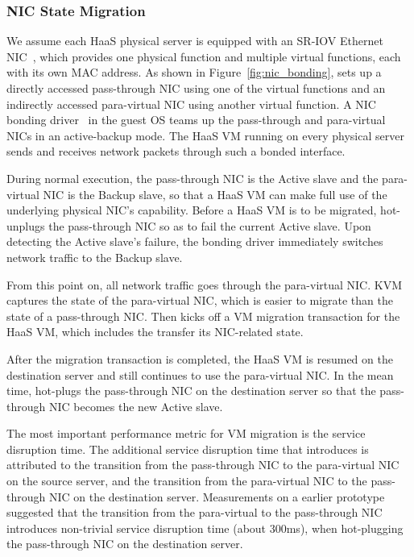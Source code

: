 \subsubsection{NIC State Migration}
\label{sec:nic_migration}

We assume each HaaS physical server is equipped with an SR-IOV Ethernet NIC~\cite{dong:2008},
which provides one physical function and multiple virtual functions, each with its own MAC address.
As shown in Figure~\ref{fig:nic_bonding},
\na sets up a directly accessed pass-through NIC using one of the virtual functions
and an indirectly accessed para-virtual NIC using another virtual function.
A NIC bonding driver~\cite{bond-dri} in the guest OS teams up the pass-through and para-virtual NICs in an active-backup mode.
The HaaS VM running on every \na physical server sends and receives network packets through such a bonded interface.

During normal execution, the pass-through NIC is the Active slave and the para-virtual NIC is the Backup slave,
so that a HaaS VM can make full use of the underlying physical NIC's capability.
Before a HaaS VM is to be migrated, \na hot-unplugs the pass-through NIC so as to fail the current Active slave.
Upon detecting the Active slave's failure, the bonding driver immediately switches network traffic to the Backup slave.

From this point on, all network traffic goes through the para-virtual NIC.
KVM captures the state of the para-virtual NIC, which is easier to migrate than the state of a pass-through NIC.
Then \na kicks off a VM migration transaction for the HaaS VM, which includes the transfer its NIC-related state.

After the migration transaction is completed, the HaaS VM is resumed on the destination server and still continues to use the para-virtual NIC.
In the mean time, \na hot-plugs the pass-through NIC on the destination  server
so that the pass-through NIC becomes the new Active slave.



The most important performance metric for VM migration is the service disruption time.
The additional service disruption time that \na introduces is attributed to the transition from
the pass-through NIC to the para-virtual NIC on the source server, and the transition from
the para-virtual NIC to the pass-through NIC on the destination server.
Measurements on a earlier \na prototype suggested that the transition from the
para-virtual to the pass-through NIC introduces non-trivial service disruption time (about 300ms),
when hot-plugging the pass-through NIC on the destination server.

